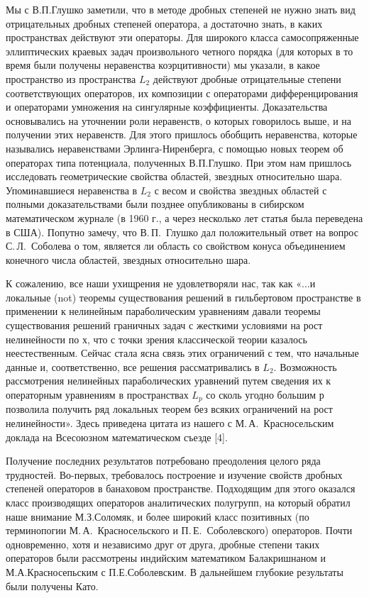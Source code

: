 Мы с В.П.Глушко заметили, что в методе дробных степеней не нужно знать вид отрицательных дробных степеней оператора,
а достаточно знать, в каких пространствах действуют эти операторы.
Для широкого класса самосопряженные эллиптических краевых задач произвольного четного порядка
(для которых в то время были получены неравенства коэрцитивности) мы указали, в какое пространство из пространства $L_2$
действуют дробные отрицательные степени соответствующих операторов,
их композиции с операторами дифференцирования и операторами умножения на сингулярные коэффициенты.
Доказательства основывались на уточнении роли неравенств, о которых говорилось выше, и на получении этих неравенств.
Для этого пришлось обобщить неравенства, которые назывались неравенствами Эрлинга-Ниренберга,
с помощью новых теорем об операторах типа потенциала, полученных В.П.Глушко.
При этом нам пришлось исследовать геометрические свойства областей, звездных относительно шара.
Упоминавшиеся неравенства в $L_2$
с весом и свойства звездных областей с полными доказательствами были позднее опубликованы
в сибирском математическом журнале (в 1960 г., а через несколько лет статья была переведена в США).
Попутно замечу, что В.\,П.~Глушко дал положительный ответ на вопрос С.\,Л.~Соболева о том, является ли область со свойством конуса объединением конечного числа областей, звездных относительно шара.

К сожалению, все наши ухищрения не удовлетворяли нас,
так как «...и локальные (not) теоремы существования решений в гильбертовом пространстве
в применении к нелинейным параболическим уравнениям давали теоремы существования решений граничных задач
с жесткими условиями на рост нелинейности по $х$,
что с точки зрения классической теории казалось неестественным.
Сейчас стала ясна связь этих ограничений с тем, что начальные данные и, соответственно,
все решения рассматривались в $L_2$.
Возможность рассмотрения нелинейных параболических уравнений путем сведения их к операторным уравнениям в пространствах $L_p$
со сколь угодно большим $р$ позволила получить ряд локальных теорем без всяких ограничений на рост нелинейности».
Здесь приведена цитата из нашего с М.\,А.~Красносельским доклада на Всесоюзном математическом съезде [4].

Получение последних результатов потребовано преодоления целого ряда трудностей.
Во-первых, требовалось построение и изучение свойств дробных степеней операторов в банаховом пространстве.
Подходящим дпя этого оказался класс производящих операторов аналитических полугрупп,
на который обратил наше внимание М.З.Соломяк, и более широкий класс позитивных
(по терминопогии М.\,А.~Красносельского и П.\,Е.~Соболевского) операторов. Почти одновременно, хотя и независимо друг от друга, дробные степени таких операторов были рассмотрены индийским математиком Балакришнаном и М.А.Красносепьским с П.Е.Соболевским. В дальнейшем глубокие результаты были получены Като.

